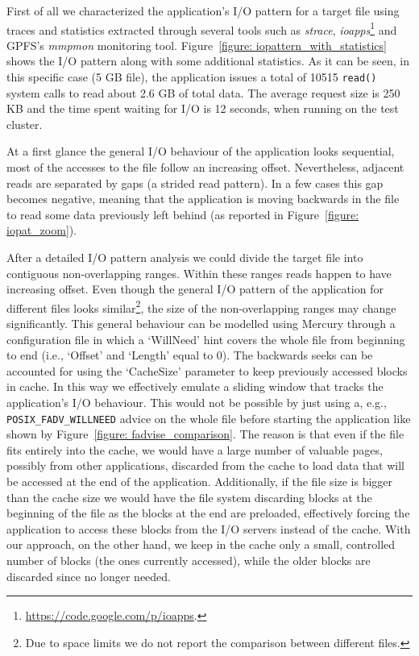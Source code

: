 First of all we characterized the application's I/O pattern for a target file using traces and statistics extracted through several tools such as \textit{strace}, \textit{ioapps}\footnote{\url{https://code.google.com/p/ioapps}.} 
and GPFS's \textit{mmpmon} monitoring tool. 
Figure~\ref{figure: iopattern_with_statistics} shows the I/O pattern along with some additional statistics. As it can be seen, in this specific case (5 GB file), the application issues a total of 
10515 \texttt{read()} system calls to read about 2.6 GB of total data. The average request size is 250 KB and the time spent waiting for I/O is 12 seconds, when running on the test cluster. 

At a first glance the general I/O behaviour of the application looks sequential, most of the accesses to the file follow an increasing offset. Nevertheless, adjacent reads are separated by gaps 
(a strided read pattern). In a few cases this gap becomes negative, meaning that the application is moving backwards in the file to read some data previously left behind (as reported in 
Figure~\ref{figure: iopat_zoom}).

After a detailed I/O pattern analysis we could divide the target file into contiguous non-overlapping ranges. Within these ranges reads happen to have increasing offset. Even though the general 
I/O pattern of the application for different files looks similar\footnote{Due to space limits we do not report the comparison between different files.}, the size of the non-overlapping ranges may 
change significantly. This general behaviour can be modelled using Mercury through a configuration file in which a `WillNeed' hint covers the whole file from beginning to end (i.e., `Offset' and `Length' equal to 
0). The backwards seeks can be accounted for using the `CacheSize' parameter to keep previously accessed blocks in cache. In this way we effectively emulate a sliding window that tracks the application's 
I/O behaviour. This would not be possible by just using a, e.g., \texttt{POSIX\_FADV\_WILLNEED} advice on the whole file before starting the application like shown by Figure~\ref{figure: fadvise_comparison}. 
The reason is that even if the file fits entirely into the cache, we would have a large number of valuable pages, possibly from other applications, discarded from the cache to load data that will be accessed at the end of 
the application. Additionally, if the file size is bigger than the cache size we would have the file system discarding blocks at the beginning of the file as the blocks at the end are preloaded, 
effectively forcing the application to access these blocks from the I/O servers instead of the cache. With our approach, on the other hand, we keep in the cache only a small, controlled number of 
blocks (the ones currently accessed), while the older blocks are discarded since no longer needed.

